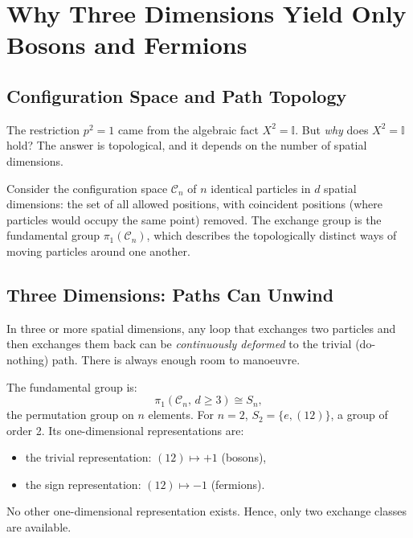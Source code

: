 \documentclass[11pt,a4paper]{article}
\newcommand{\id}{\mathbb{I}}
\begin{document}
\section{Why Three Dimensions Yield Only Bosons and Fermions}
\label{sec:3d-topology}

\subsection{Configuration Space and Path Topology}

The restriction $p^2=1$ came from the algebraic fact $X^2 = \id$.  But
\emph{why} does $X^2 = \id$ hold?  The answer is topological, and it depends
on the number of spatial dimensions.

Consider the configuration space $\mathcal{C}_n$ of $n$ identical particles in
$d$ spatial dimensions: the set of all allowed positions, with coincident
positions (where particles would occupy the same point) removed.  The exchange
group is the fundamental group $\pi_1(\mathcal{C}_n)$, which describes the
topologically distinct ways of moving particles around one another.

\subsection{Three Dimensions: Paths Can Unwind}

In three or more spatial dimensions, any loop that exchanges two particles and
then exchanges them back can be \emph{continuously deformed} to the trivial
(do-nothing) path.  There is always enough room to manoeuvre.

The fundamental group is:
\[
  \pi_1(\mathcal{C}_n,\, d \geq 3) \cong S_n,
\]
the permutation group on $n$ elements.  For $n=2$, $S_2 = \{e, (12)\}$, a
group of order 2.  Its one-dimensional representations are:
\begin{itemize}
  \item the trivial representation: $(12) \mapsto +1$ \quad (bosons),
  \item the sign representation: $(12) \mapsto -1$ \quad (fermions).
\end{itemize}
No other one-dimensional representation exists.  Hence, only two exchange
classes are available.
\end{document}
